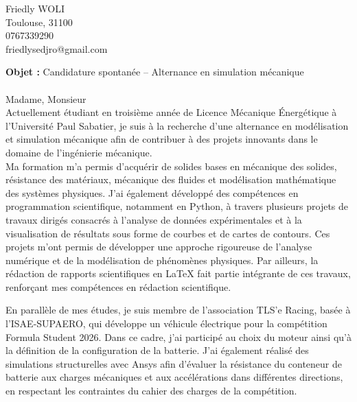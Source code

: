 \documentclass[11pt,a4paper]{article}
\begin{document}
	\pagestyle{empty}
	
	\noindent
	Friedly WOLI \\  %
	Toulouse, 31100  \\
	0767339290 \\
	friedlysedjro@gmail.com 
	
	\begin{flushright}
		
	
	\end{flushright}
	
	
	\bigskip
	
	
	
	
	
	
	\textbf{Objet :} Candidature spontanée – Alternance en simulation mécanique \\ \\
	Madame, Monsieur\\
	

			
			Actuellement étudiant en troisième année de Licence Mécanique Énergétique à l’Université Paul Sabatier, je suis à la recherche d’une alternance en modélisation et simulation mécanique afin de contribuer à des projets innovants dans le domaine de l’ingénierie mécanique.\\
			
			Ma formation m’a permis d’acquérir de solides bases en mécanique des solides, résistance des matériaux, mécanique des fluides et modélisation mathématique des systèmes physiques. J’ai également développé des compétences en programmation scientifique, notamment en Python, à travers plusieurs projets de travaux dirigés consacrés à l’analyse de données expérimentales et à la visualisation de résultats sous forme de courbes et de cartes de contours. Ces projets m’ont permis de développer une approche rigoureuse de l’analyse numérique et de la modélisation de phénomènes physiques. Par ailleurs, la rédaction de rapports scientifiques en LaTeX fait partie intégrante de ces travaux, renforçant mes compétences en rédaction scientifique.
			
			En parallèle de mes études, je suis membre de l’association TLS'e Racing, basée à l’ISAE-SUPAERO, qui développe un véhicule électrique pour la compétition Formula Student 2026. Dans ce cadre, j’ai participé au choix du moteur ainsi qu’à la définition de la configuration de la batterie. J’ai également réalisé des simulations structurelles avec Ansys afin d’évaluer la résistance du conteneur de batterie aux charges mécaniques et aux accélérations dans différentes directions, en respectant les contraintes du cahier des charges de la compétition.\\
						
\end{document}
